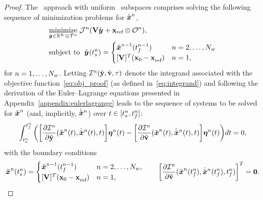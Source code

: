 \begin{proof}
The \methodAcronym\ approach with uniform \spatialAcronym\ subspaces comprises solving the following sequence of minimization problems for $\hat{ \boldsymbol x}^{n}$,
\begin{equation}\label{eq:obj_proof}
\begin{split}
      & \underset{\genstateyArgnt{} \in \RR{\romdim} \otimes \timeSpaceArg{n}}{\text{minimize}}\; \mathcal{J}^n(\basisspace \genstateyArgnt{} + \stateIntercept \otimes \onesFunctionArg{n}), \\ 
      & \text{subject to }\; \genstateyArg{}{\timeStartArg{n}} =
\begin{cases} \genstateArg{n-1}{\timeEndArg{n-1}} & n = 2,\ldots,\nslabs \\
\genstateIC & n=1, \end{cases} 
\end{split}
\end{equation}
for $n = 1,\ldots,N_w$. Letting $\mathcal{I}^{n}(\hat{\mathbf{y}},\hat{\mathbf{v}},\tau)$ denote the integrand associated with the objective function~\eqref{eq:obj_proof} (as defined in~\eqref{eq:integrand}) and following the derivation of the Euler--Lagrange equations presented in Appendix~\ref{appendix:eulerlagrange} leads to the sequence of systems to be solved for $\hat{ \boldsymbol x}^n$ (and, implicitly, $\dot{\hat{ \boldsymbol x}}^{n}$) over $t \in [t_s^{n},t_f^{n}]$:
\begin{equation}\label{eq:g_equiv_1}
 \int_{t_s^{n}}^{t_f^{n}} \bigg( \bigg[ \frac{\partial \mathcal{I}^{n}  }{\partial \hat{\mathbf{y}} }(\hat{ \boldsymbol x}^{n}(t),\dot{\hat{ \boldsymbol x}}^{n}(t),t) \bigg]  \boldsymbol \eta^{n}(t)  - \bigg[ \frac{\partial \mathcal{I}^{n}}{\partial \hat{\mathbf{v}}} (\hat{ \boldsymbol x}^{n}(t),\dot{\hat{ \boldsymbol x}}^{n}(t),t ) \bigg] \boldsymbol \eta^{n}(t) \bigg)dt  = 0,
\end{equation}
with the boundary conditions
\begin{equation*}
 \genstate^n(\timeStartArg{n})  = 
\begin{cases}
\genstate^{n-1}(\timeEndArg{n-1}) & n=2,\ldots,\nslabs, \\
\genstateIC & n=1, \end{cases} \qquad 
\bigg[\frac{\partial \minintegrandArg{n}}{\partial \genstateyDiscreteDot}(\genstateArg{n}{\timeEndArg{n}},\genstateDotArg{n}{\timeEndArg{n}},\timeEndArg{n}) \bigg]^T= \boldsymbol 0.

\end{equation*}
\end{proof}
